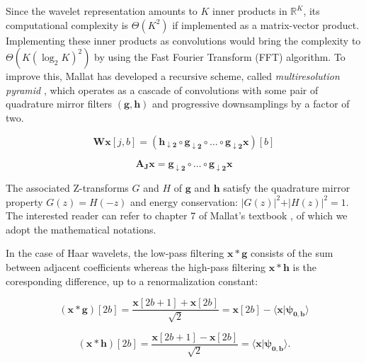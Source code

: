 \documentclass{article}
\begin{document}
Since the wavelet representation amounts to $K$ inner products in $\mathbb{R}^K$,
its computational complexity is $\Theta(K^2)$ if implemented as a matrix-vector product.
Implementing these inner products as convolutions would bring the complexity to
$\Theta{(K (\log_2 K)^2)}$ by using the Fast Fourier Transform (FFT) algorithm.
To improve this, Mallat has developed a recursive scheme, called
\emph{multiresolution pyramid} \cite{mallat1989theory}, which operates as a cascade
of convolutions with some pair of quadrature mirror filters
$(\boldsymbol{g}, \boldsymbol{h})$ and progressive downsamplings by a factor of two.

\begin{equation}
\boldsymbol{Wx}[j,b] =
\left(
\boldsymbol{h_{\downarrow 2}} \circ
\boldsymbol{g_{\downarrow 2}} \circ \ldots \circ
\boldsymbol{g_{\downarrow 2}}\boldsymbol{x}
\right)[b]
\end{equation}

\begin{equation}
\boldsymbol{A_J x} =
\boldsymbol{g_{\downarrow 2}} \circ \ldots \circ
\boldsymbol{g_{\downarrow 2}}\boldsymbol{x}
\end{equation}

The associated Z-transforms $G$ and $H$ of $\boldsymbol{g}$
and $\boldsymbol{h}$ satisfy the quadrature mirror property $G(z) = H(-z)$ and
energy conservation: $\vert G(z) \vert ^2 + \vert H(z) \vert ^2 = 1$.
The interested reader can refer to chapter 7 of Mallat's textbook \cite{mallat2008wavelet},
of which we adopt the mathematical notations.

In the case of Haar wavelets, the low-pass filtering $\boldsymbol{x} \ast \boldsymbol{g}$
consists of the sum between adjacent coefficients whereas the high-pass filtering
$\boldsymbol{x} \ast \boldsymbol{h}$ is the coresponding difference, up to a
renormalization constant:

\begin{equation}
(\boldsymbol{x}
\ast
\boldsymbol{g})[2b]
=
\frac{ \boldsymbol{x}[2b+1] + \boldsymbol{x}[2b]}{\sqrt{2}}
=
\boldsymbol{x}[2b]
-
\langle \boldsymbol{x} \vert \boldsymbol{\psi_{0,b}} \rangle
\end{equation}

\begin{equation}
(\boldsymbol{x}
\ast
\boldsymbol{h})[2b]
=
\frac{ \boldsymbol{x}[2b+1] - \boldsymbol{x}[2b]}{\sqrt{2}}
=
\langle \boldsymbol{x} \vert \boldsymbol{\psi_{0,b}} \rangle.
\end{equation}
\end{document}
